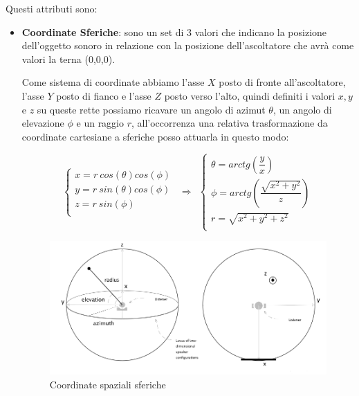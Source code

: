 \documentclass[12pt,a4paper]{report}
\begin{document}
Questi attributi sono:
\begin{itemize}\label{aaa}
\item \textbf{Coordinate Sferiche}: sono un set di 3 valori che indicano la posizione dell'oggetto sonoro in relazione con la posizione dell'ascoltatore che avrà come valori la terna (0,0,0).

Come sistema di coordinate abbiamo l'asse $X$ posto di fronte all'ascoltatore, l'asse $Y$ posto di fianco e l'asse $Z$ posto verso l'alto, quindi definiti i valori $x,y$ e $z$ su queste rette possiamo ricavare un angolo di azimut $\theta$, un angolo di elevazione $\phi$ e un raggio $r$, all'occorrenza una relativa trasformazione da coordinate cartesiane a sferiche posso attuarla in questo modo:

\begin{equation}
	\left\{\begin{matrix}
x= r\ cos(\theta) cos(\phi) \\
y= r\ sin(\theta) cos(\phi)\\
z= r\ sin(\phi)\\
\end{matrix}\right. \ \ \Rightarrow \ \  \left\{\begin{matrix}
\theta = arctg \left(\dfrac{y}{x} \right) \\
\phi   = arctg \left(\dfrac{\sqrt{x^2 + y^2 }}{z} \right) \\
r = \sqrt{x^2 +y^2 +z^2 }\\
\end{matrix}\right.
	\label{eq:coordinatepolari}
\end{equation}

\begin{figure}[htbp]
	\centering
	\includegraphics[scale=0.40]{figures/azimut.png}
	\caption {Coordinate spaziali sferiche}
	\label{fig:coordinate}
	\end{figure}


\end{itemize}
\end{document}
